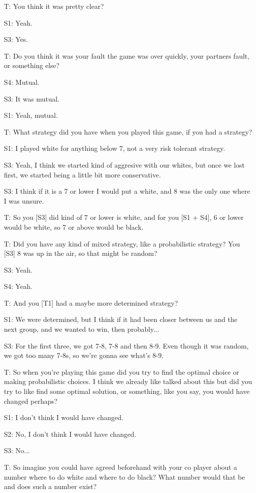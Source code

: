 T: You think it was pretty clear?

S1: Yeah.

S3: Yes.

T: Do you think it was your fault the game was over quickly, your partners fault, or something else?

S4: Mutual.

S3: It was mutual.

S1: Yeah, mutual.

T: What strategy did you have when you played this game, if you had a strategy?

S1: I played white for anything below 7, not a very risk tolerant strategy.

S3: Yeah, I think we started kind of aggresive with our whites, but once we lost first, we started being a little bit more conservative.

S3: I think if it is a 7 or lower I would put a white, and 8 was the only one where I was unsure.

T: So you [S3] did kind of 7 or lower is white, and for you [S1 + S4], 6 or lower would be white, so 7 or above would be black.

T: Did you have any kind of mixed strategy, like a probabilistic strategy? You [S3] 8 was up in the air, so that might be random?

S3: Yeah.

S4: Yeah.

T: And you [T1] had a maybe more determined strategy?

S1: We were determined, but I think if it had been closer between us and the next group, and we wanted to win, then probably...

S3: For the first three, we got 7-8, 7-8 and then 8-9. Even though it was random, we got too many 7-8s, so we're gonna see what's 8-9.

T: So when you're playing this game did you try to find the optimal choice or making probabilistic choices. I think we already like talked about this but did you try to like find some optimal solution, or something, like you say, you would have changed perhaps?

S1: I don't think I would have changed.

S2: No, I don't think I would have changed.

S3: No...

T: So imagine you could have agreed beforehand with your co player about a number where to do white and where to do black? What number would that be and does such a number exist?

